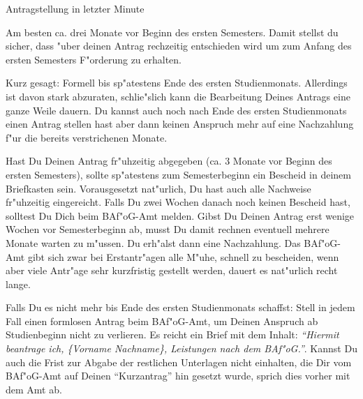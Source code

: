 \begin{artikel}{Antragstellung in letzter Minute}
\vspace*{-1ex}%

Am besten ca. drei Monate vor Beginn des ersten Semesters. Damit stellst du sicher, dass "uber deinen Antrag rechzeitig entschieden wird um zum Anfang des ersten Semesters F"orderung zu erhalten.

Kurz gesagt: Formell bis sp"atestens Ende des ersten Studienmonats. Allerdings ist davon stark abzuraten, schlie"slich kann die Bearbeitung Deines Antrags eine ganze Weile dauern. Du kannst auch noch nach Ende des ersten Studienmonats einen Antrag stellen hast aber dann keinen Anspruch mehr auf eine Nachzahlung f"ur die bereits verstrichenen Monate.

Hast Du Deinen Antrag fr"uhzeitig abgegeben (ca. 3 Monate vor Beginn des ersten Semesters), sollte sp"atestens zum Semesterbeginn ein Bescheid in deinem Briefkasten sein. Vorausgesetzt nat"urlich, Du hast auch alle Nachweise fr"uhzeitig eingereicht. Falls Du zwei Wochen danach noch keinen Bescheid hast, solltest Du Dich beim BAf"oG-Amt melden. Gibst Du Deinen Antrag erst wenige Wochen vor Semesterbeginn ab, musst Du damit rechnen eventuell mehrere Monate warten zu m"ussen. Du erh"alst dann eine Nachzahlung. Das BAf"oG-Amt gibt sich zwar bei Erstantr"agen alle M"uhe, schnell zu bescheiden, wenn aber viele Antr"age sehr kurzfristig gestellt werden, dauert es nat"urlich recht lange. 

Falls Du es nicht mehr bis Ende des ersten Studienmonats schaffst: 
Stell in jedem Fall einen formlosen Antrag beim BAf"oG-Amt, um Deinen Anspruch ab Studienbeginn nicht zu verlieren. Es reicht ein Brief mit dem Inhalt: \textit{"`Hiermit beantrage ich, \textit{\{Vorname Nachname\}}, Leistungen nach dem BAf"oG."'}. Kannst Du auch die Frist zur Abgabe der restlichen Unterlagen nicht einhalten, die Dir vom BAf"oG-Amt auf Deinen "`Kurzantrag"' hin gesetzt wurde, sprich dies vorher mit dem Amt ab.
\end{artikel}

